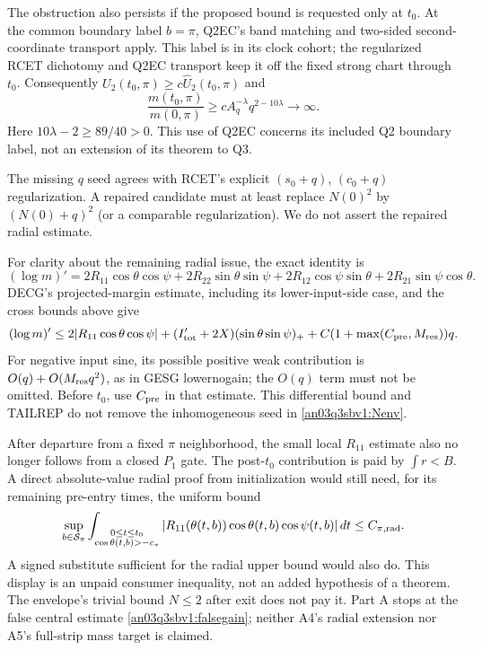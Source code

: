\documentclass[11pt]{article}
\numberwithin{equation}{section}
\theoremstyle{remark}\newtheorem{remark}[proposition]{Remark}
\newcommand{\dd}{\,d}
\newcommand{\Sm}{\mathcal S}
\begin{document}
The obstruction also persists if the proposed bound is requested
only at $t_0$. At the common boundary label $b=\pi$, Q2EC's band
matching and two-sided second-coordinate transport apply. This label
is in its clock cohort; the regularized RCET dichotomy and Q2EC
transport keep it off the fixed strong chart through $t_0$.
Consequently $U_2(t_0,\pi)\ge c\widehat U_2(t_0,\pi)$ and
\begin{equation}
 \frac{m(t_0,\pi)}{m(0,\pi)}
       \ge c A_q^{-\lambda}q^{2-10\lambda}\longrightarrow\infty.
 \label{an03q3sbv1:endpointcounter}
\end{equation}
Here $10\lambda-2\ge89/40>0$. This use of Q2EC concerns its
included Q2 boundary label, not an extension of its theorem to Q3.

The missing $q$ seed agrees with RCET's explicit $(s_0+q)$,
$(c_0+q)$ regularization. A repaired candidate must at least replace
$N(0)^2$ by $(N(0)+q)^2$ (or a comparable regularization).
We do not assert the repaired radial estimate.

For clarity about the remaining radial issue, the exact identity is
\[
 (\log m)'=2R_{11}\cos\theta\cos\psi
       +2R_{22}\sin\theta\sin\psi
       +2R_{12}\cos\psi\sin\theta
       +2R_{21}\sin\psi\cos\theta .
\]
DECG's projected-margin estimate, including its lower-input-side
case, and the cross bounds above give
\begin{equation}
 (\log m)'\le2|R_{11}\cos\theta\cos\psi|
       +(I_{\rm tot}'+2X)(\sin\theta\sin\psi)_+
       +C(1+\max(C_{\rm pre},M_{\rm res}))q .
 \label{an03q3sbv1:radialvalid}
\end{equation}
For negative input sine, its possible positive weak contribution is
$O(q)+O(M_{\rm res}q^2)$, as in GESG lowernogain; the $O(q)$ term
must not be omitted. Before $t_0$, use $C_{\rm pre}$ in that estimate.
This differential bound and TAILREP do not remove the inhomogeneous
seed in \eqref{an03q3sbv1:Nenv}.

After departure from a fixed $\pi$ neighborhood, the small local
$R_{11}$ estimate also no longer follows from a closed $P_1$ gate.
The post-$t_0$ contribution is paid by $\int r<B$.
A direct absolute-value radial proof from initialization would
still need, for its remaining pre-entry times, the uniform bound
\begin{equation}
 \sup_{b\in\Sm_\pi}
 \int_{\substack{0\le t\le t_0\\ \cos\theta(t,b)>-c_*}}
 |R_{11}(\theta(t,b))\cos\theta(t,b)\cos\psi(t,b)|\dd t
 \le C_{\pi,\rm rad}.
 \label{an03q3sbv1:unpaidradial}
\end{equation}
A signed substitute sufficient for the radial upper bound would also
do. This display is an unpaid consumer inequality, not an added
hypothesis of a theorem. The envelope's trivial bound $N\le2$ after
exit does not pay it. Part A stops at the false central estimate
\eqref{an03q3sbv1:falsegain}; neither A4's radial extension nor A5's
full-strip mass target is claimed.
\end{document}
